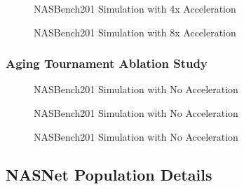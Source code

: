 \documentclass[twocolumn]{article}
\begin{document}
\begin{figure}
    \begin{center}
        
    \end{center}
    \caption{NASBench201 Simulation with 4x Acceleration}
    \label{fig:evo_nasbench_4x_acceleration}
\end{figure}

\begin{figure}
    \begin{center}
        
    \end{center}
    \caption{NASBench201 Simulation with 8x Acceleration}
    \label{fig:evo_nasbench_8x_acceleration}
\end{figure}

\FloatBarrier
\subsubsection{Aging Tournament Ablation Study}

\begin{figure}
    \begin{center}
        
    \end{center}
    \caption{NASBench201 Simulation with No Acceleration}
    \label{fig:evo_ext_nasbench_1x_acceleration}
\end{figure}

\begin{figure}
    \begin{center}
        
    \end{center}
    \caption{NASBench201 Simulation with No Acceleration}
    \label{fig:evo_ext_nasbench_all_perfs}
\end{figure}

\begin{figure}
    \begin{center}
        
    \end{center}
    \caption{NASBench201 Simulation with No Acceleration}
    \label{fig:evo_ext_nasbench_best_at_slice}
\end{figure}

\FloatBarrier
\subsection{NASNet Population Details}
\end{document}
